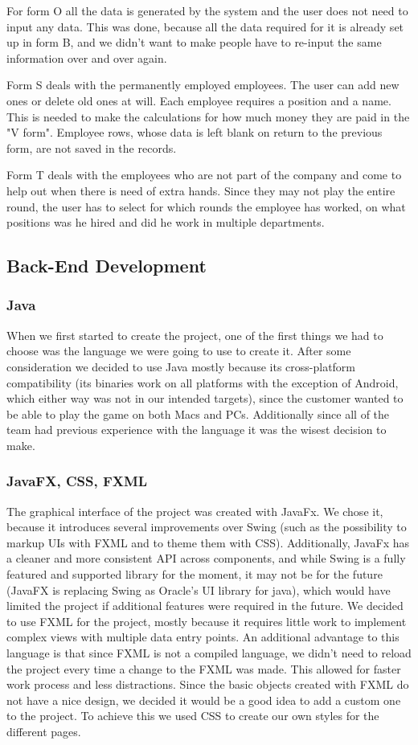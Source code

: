 \documentclass{l3proj}
\begin{document}
For form O all the data is generated by the system and the user does not need to input any data. This was done, because all the data required for it is already set up in form B, and we didn't want to make people have to re-input the same information over and over again.

Form S deals with the permanently employed employees. The user can add new ones or delete old ones at will. Each employee requires a position and a name. This is needed to make the calculations for how much money they are paid in the "V form". Employee rows, whose data is left blank on return to the previous form, are not saved in the records.

Form T deals with the employees who are not part of the company and come to help out when there is need of extra hands. Since they may not play the entire round, the user has to select for which rounds the employee has worked, on what positions was he hired and did he work in multiple departments.

\subsection{Back-End Development}
\subsubsection{Java}
When we first started to create the project, one of the first things we had to choose was the language we were going to use to create it. After some consideration we decided to use Java mostly because its cross-platform compatibility (its binaries work on all platforms with the exception of Android, which either way was not in our intended targets), since the customer wanted to be able to play the game on both Macs and PCs. Additionally since all of the team had previous experience with the language it was the wisest decision to make.


\subsubsection{JavaFX, CSS, FXML}
The graphical interface of the project was created with JavaFx. We chose it, because it introduces several improvements over Swing (such as the possibility to markup UIs with FXML and to theme them with CSS). Additionally, JavaFx has a cleaner and more consistent API across components, and while Swing is a fully featured and supported library for the moment, it may not be for the future (JavaFX is replacing Swing as Oracle's UI library for java), which would have limited the project if additional features were required in the future.
We decided to use FXML for the project, mostly because it requires little work to implement complex views with multiple data entry points. An additional advantage to this language is that since FXML is not a compiled language, we didn't need to reload the project every time a change to the FXML was made. This allowed for faster work process and less distractions. 
Since the basic objects created with FXML do not have a nice design, we decided it would be a good idea to add a custom one to the project. To achieve this we used CSS to create our own styles for the different pages.
\end{document}
